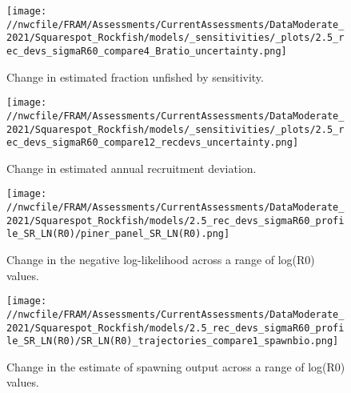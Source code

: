 \documentclass[11pt,
  english,
  a4paper,
]{article}
\begin{document}
\tagmcend\tagstructend


\begin{figure}
\centering
\texttt{[image: //nwcfile/FRAM/Assessments/CurrentAssessments/DataModerate\_2021/Squarespot\_Rockfish/models/\_sensitivities/\_plots/2.5\_rec\_devs\_sigmaR60\_compare4\_Bratio\_uncertainty.png]}
\caption{Change in estimated fraction unfished by sensitivity.\label{fig:sens-depl}}
\end{figure}

\tagmcend\tagstructend


\begin{figure}
\centering
\texttt{[image: //nwcfile/FRAM/Assessments/CurrentAssessments/DataModerate\_2021/Squarespot\_Rockfish/models/\_sensitivities/\_plots/2.5\_rec\_devs\_sigmaR60\_compare12\_recdevs\_uncertainty.png]}
\caption{Change in estimated annual recruitment deviation.\label{fig:sens-recdev}}
\end{figure}

\tagmcend\tagstructend


\begin{figure}
\centering
\texttt{[image: //nwcfile/FRAM/Assessments/CurrentAssessments/DataModerate\_2021/Squarespot\_Rockfish/models/2.5\_rec\_devs\_sigmaR60\_profile\_SR\_LN(R0)/piner\_panel\_SR\_LN(R0).png]}
\caption{Change in the negative log-likelihood across a range of log(R0) values.\label{fig:r0-profile}}
\end{figure}

\tagmcend\tagstructend


\begin{figure}
\centering
\texttt{[image: //nwcfile/FRAM/Assessments/CurrentAssessments/DataModerate\_2021/Squarespot\_Rockfish/models/2.5\_rec\_devs\_sigmaR60\_profile\_SR\_LN(R0)/SR\_LN(R0)\_trajectories\_compare1\_spawnbio.png]}
\caption{Change in the estimate of spawning output across a range of log(R0) values.\label{fig:r0-ssb}}
\end{figure}
\end{document}
